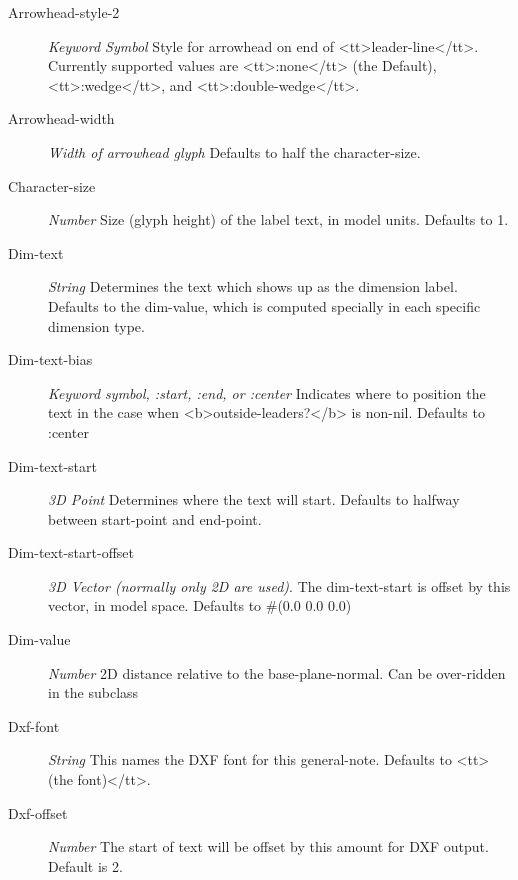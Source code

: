 \documentclass [11pt]{book}
\begin{document}
\begin{itemize}
\begin{description}
\item [Arrowhead-style-2]
\emph{Keyword Symbol} Style for arrowhead on end of <tt>leader-line</tt>. Currently supported values
are <tt>:none</tt> (the Default), <tt>:wedge</tt>, and <tt>:double-wedge</tt>.


\item [Arrowhead-width]
\emph{Width of arrowhead glyph} Defaults to half the character-size.


\item [Character-size]
\emph{Number} Size (glyph height) of the label text, in model units. Defaults to 1.


\item [Dim-text]
\emph{String} Determines the text which shows up as the dimension label. Defaults to the dim-value,
which is computed specially in each specific dimension type.


\item [Dim-text-bias]
\emph{Keyword symbol, :start, :end, or :center} Indicates where to position the text in the case when
<b>outside-leaders?</b> is non-nil. Defaults to :center


\item [Dim-text-start]
\emph{3D Point} Determines where the text will start. Defaults to halfway between start-point
and end-point.


\item [Dim-text-start-offset]
\emph{3D Vector (normally only 2D are used)}.
The dim-text-start is offset by this vector, in model space. Defaults to \#(0.0 0.0 0.0)


\item [Dim-value]
\emph{Number} 2D distance relative to the base-plane-normal. Can be over-ridden in the subclass


\item [Dxf-font]
\emph{String} This names the DXF font for this general-note. Defaults to <tt>(the font)</tt>.


\item [Dxf-offset]
\emph{Number} The start of text will be offset by this amount for DXF output. Default is 2.



\end{description}
\end{itemize}
\end{document}
